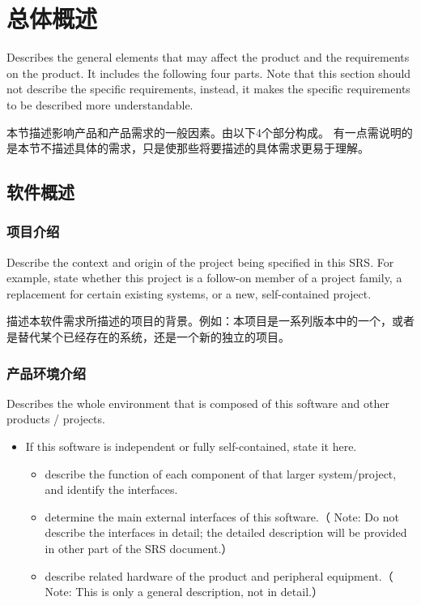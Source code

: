 \chapter{总体概述}

Describes the general elements that may affect the product and the requirements on the product. It includes the following four parts. Note that this section should not describe the specific requirements, instead, it makes the specific requirements to be described more understandable.

本节描述影响产品和产品需求的一般因素。由以下4个部分构成。 有一点需说明的是本节不描述具体的需求，只是使那些将要描述的具体需求更易于理解。
\section{软件概述}
\subsection{项目介绍}
Describe the context and origin of the project being specified in this SRS. For example, state whether this project is a follow-on member of a project family, a replacement for certain existing systems, or a new, self-contained project.

描述本软件需求所描述的项目的背景。例如：本项目是一系列版本中的一个，或者是替代某个已经存在的系统，还是一个新的独立的项目。

\subsection{产品环境介绍}
Describes the whole environment that is composed of this software and other products / projects.
\begin{itemize}
\item If this software is independent or fully self-contained, state it here.
\begin{itemize}
\item describe the function of each component of that larger system/project, and identify the interfaces.
\item determine the main external interfaces of this software.（ Note: Do not describe the interfaces in detail; the detailed description will be provided in other part of the SRS document.）
\item describe related hardware of the product and peripheral equipment.（ Note: This is only  a general description, not in detail.）
\end{itemize}
\end{itemize}

